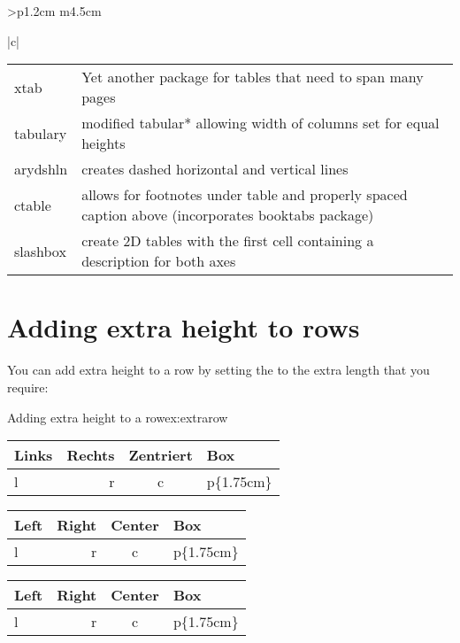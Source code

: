 \begin{tabular}{>{\bfseries}p{1.2cm} m{4.5cm}}
\begin{tabular}[t]{|c|}
\begin{longtable}
\begin{scriptexample}{}{}
\begin{longtable}{lp{7cm}}
xtab &Yet another package for tables that need to span many pages\\

tabulary &modified tabular* allowing width of columns set for equal heights\\

arydshln &creates dashed horizontal and vertical lines\\

ctable &allows for footnotes under table and properly spaced caption above (incorporates booktabs package)\\

slashbox &create 2D tables with the first cell containing a description for both axes\\
\bottomrule
\end{longtable}


\clearpage

\section{Adding extra height to rows}

You can add extra height to a row by setting the  to the extra length that you require:


\begin{texexample}{Adding extra height to a row}{ex:extrarow}
\setlength\extrarowheight{2pt}
\begin{tabular}{|l|r|c|p{1.75cm}|}\hline
  Links & Rechts & Zentriert & Box\\\hline
  \rowcolor{thegray}
  l & r & c & p\{1.75cm\}\\\hline
\end{tabular}
\end{texexample}

\bigskip

{
\setlength\extrarowheight{2pt}
\begin{tabular}{|l|r|c|p{1.75cm}|}\hline
Left & Right & Center & Box\\\hline
\rowcolor{cyan!40}
l & r & c & p\{1.75cm\}\\\hline
\end{tabular}
}
{
\setlength\extrarowheight{0pt}
\begin{tabular}{|l|r|c|p{1.75cm}|}\hline
Left & Right & Center & Box\\\hline
\rowcolor{cyan!40}
l & r & c & p\{1.75cm\}\\\hline
\end{tabular}
}


\end{scriptexample}
\end{longtable}
\end{tabular}
\end{tabular}
